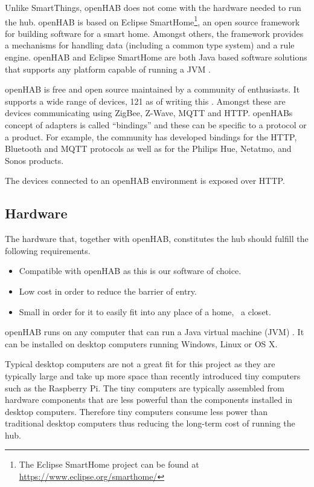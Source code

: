 Unlike SmartThings, openHAB \cite{OPENHAB} does not come with the hardware needed to run the hub.
openHAB is based on Eclipse SmartHome\footnote{The Eclipse SmartHome project can be found at \url{https://www.eclipse.org/smarthome/}}, an open source framework for building software for a smart home. Amongst others, the framework provides a mechanisms for handling data (including a common type system) and a rule engine.
openHAB and Eclipse SmartHome are both Java based software solutions that supports any platform capable of running a JVM \cite{openhab:introduction}.

openHAB is free and open source maintained by a community of enthusiasts. It supports a wide range of devices, 121 as of writing this \cite{openhab:supported-technologies}. Amongst these are devices communicating using ZigBee, Z-Wave, MQTT and HTTP. openHABs concept of adapters is called ``bindings'' and these can be specific to a protocol or a product. For example, the community has developed bindings for the HTTP, Bluetooth and MQTT protocols as well as for the Philips Hue, Netatmo, and Sonos products.

The devices connected to an openHAB environment is exposed over HTTP.

\subsection{Hardware}

The hardware that, together with openHAB, constitutes the hub should fulfill the following requirements.

\begin{itemize}
\item Compatible with openHAB as this is our software of choice.
\item Low cost in order to reduce the barrier of entry.
\item Small in order for it to easily fit into any place of a home, \eg~a closet.
\end{itemize}

openHAB runs on any computer that can run a Java virtual machine (JVM) \cite{openhab:introduction}. It can be installed on desktop computers running Windows, Linux or OS X.

Typical desktop computers are not a great fit for this project as they are typically large and take up more space than recently introduced tiny computers such as the Raspberry Pi. The tiny computers are typically assembled from hardware components that are less powerful than the components installed in desktop computers. Therefore tiny computers consume less power than traditional desktop computers thus reducing the long-term cost of running the hub.

